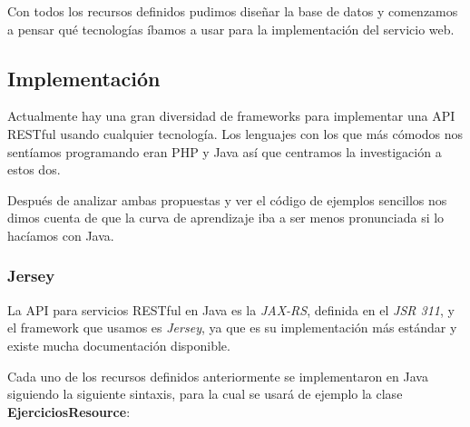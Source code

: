Con todos los recursos definidos pudimos diseñar la base de datos y comenzamos a pensar qué tecnologías íbamos a usar para la implementación del servicio web.

\subsection{Implementación}

Actualmente hay una gran diversidad de frameworks para implementar una API RESTful usando cualquier tecnología. Los lenguajes con los que más cómodos nos sentíamos programando eran PHP y Java así que centramos la investigación a estos dos.
\vspace{1em}

Después de analizar ambas propuestas y ver el código de ejemplos sencillos nos dimos cuenta de que la curva de aprendizaje iba a ser menos pronunciada si lo hacíamos con Java.


\subsubsection{Jersey}


La API para servicios RESTful en Java es la \textit{JAX-RS}, definida en el \textit{JSR 311}, y el framework que usamos es \textit{Jersey}, ya que es su implementación más estándar y existe mucha documentación disponible.

\vspace{1em}

Cada uno de los recursos definidos anteriormente se implementaron en Java siguiendo la siguiente sintaxis, para la cual se usará de ejemplo la clase \textbf{EjerciciosResource}:


